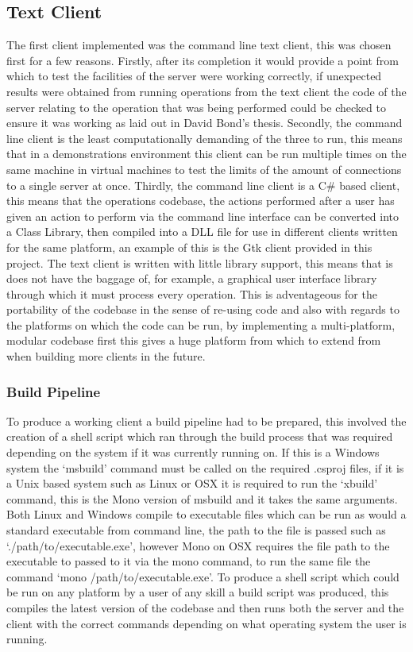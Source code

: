 \documentclass{article}
\begin{document}
\subsection{Text Client}
The first client implemented was the command line text client, this was chosen first for a few reasons. Firstly, after its completion it would provide a point from which to test the facilities of the server were working correctly, if unexpected results were obtained from running operations from the text client the code of the server relating to the operation that was being performed could be checked to ensure it was working as laid out in David Bond’s thesis. Secondly, the command line client is the least computationally demanding of the three to run, this means that in a demonstrations environment this client can be run multiple times on the same machine in virtual machines to test the limits of the amount of connections to a single server at once. Thirdly, the command line client is a C\# based client, this means that the operations codebase, the actions performed after a user has given an action to perform via the command line interface can be converted into a Class Library, then compiled into a DLL file for use in different clients written for the same platform, an example of this is the Gtk client provided in this project. The text client is written with little library support, this means that is does not have the baggage of, for example, a graphical user interface library through which it must process every operation. This is adventageous for the portability of the codebase in the sense of re-using code and also with regards to the platforms on which the code can be run, by implementing a multi-platform, modular codebase first this gives a huge platform from which to extend from when building more clients in the future. 
\subsubsection{Build Pipeline}
To produce a working client a build pipeline had to be prepared, this involved the creation of a shell script which ran through the build process that was required depending on the system if it was currently running on. If this is a Windows system the ‘msbuild’ command must be called on the required .csproj files, if it is a Unix based system such as Linux or OSX it is required to run the ‘xbuild’ command, this is the Mono version of msbuild and it takes the same arguments. Both Linux and Windows compile to executable files which can be run as would a standard executable from command line, the path to the file is passed such as ‘./path/to/executable.exe’, however Mono on OSX requires the file path to the executable to passed to it via the mono command, to run the same file the command ‘mono /path/to/executable.exe’. To produce a shell script which could be run on any platform by a user of any skill a build script was produced, this compiles the latest version of the codebase and then runs both the server and the client with the correct commands depending on what operating system the user is running.
\end{document}
